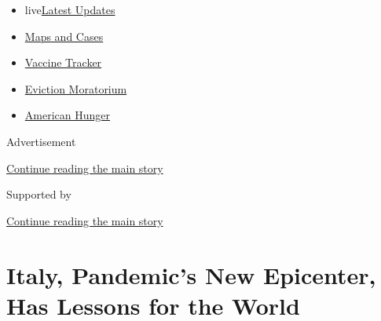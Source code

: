 \begin{itemize}
\tightlist
\item
  live\href{https://www.nytimes3xbfgragh.onion/2020/09/05/world/coronavirus-covid.html?name=styln-coronavirus-national\&region=TOP_BANNER\&block=storyline_menu_recirc\&action=click\&pgtype=Article\&impression_id=2bf9ad00-efba-11ea-80ca-fdfa1d63f0db\&variant=undefined}{Latest
  Updates}
\item
  \href{https://www.nytimes3xbfgragh.onion/interactive/2020/us/coronavirus-us-cases.html?name=styln-coronavirus-national\&region=TOP_BANNER\&block=storyline_menu_recirc\&action=click\&pgtype=Article\&impression_id=2bf9ad01-efba-11ea-80ca-fdfa1d63f0db\&variant=undefined}{Maps
  and Cases}
\item
  \href{https://www.nytimes3xbfgragh.onion/interactive/2020/science/coronavirus-vaccine-tracker.html?name=styln-coronavirus-national\&region=TOP_BANNER\&block=storyline_menu_recirc\&action=click\&pgtype=Article\&impression_id=2bf9ad02-efba-11ea-80ca-fdfa1d63f0db\&variant=undefined}{Vaccine
  Tracker}
\item
  \href{https://www.nytimes3xbfgragh.onion/2020/09/02/your-money/eviction-moratorium-covid.html?name=styln-coronavirus-national\&region=TOP_BANNER\&block=storyline_menu_recirc\&action=click\&pgtype=Article\&impression_id=2bf9ad03-efba-11ea-80ca-fdfa1d63f0db\&variant=undefined}{Eviction
  Moratorium}
\item
  \href{https://www.nytimes3xbfgragh.onion/interactive/2020/09/02/magazine/food-insecurity-hunger-us.html?name=styln-coronavirus-national\&region=TOP_BANNER\&block=storyline_menu_recirc\&action=click\&pgtype=Article\&impression_id=2bf9ad04-efba-11ea-80ca-fdfa1d63f0db\&variant=undefined}{American
  Hunger}
\end{itemize}

Advertisement

\protect\hyperlink{after-top}{Continue reading the main story}

Supported by

\protect\hyperlink{after-sponsor}{Continue reading the main story}

\hypertarget{italy-pandemics-new-epicenter-has-lessons-for-the-world}{%
\section{Italy, Pandemic's New Epicenter, Has Lessons for the
World}\label{italy-pandemics-new-epicenter-has-lessons-for-the-world}}

